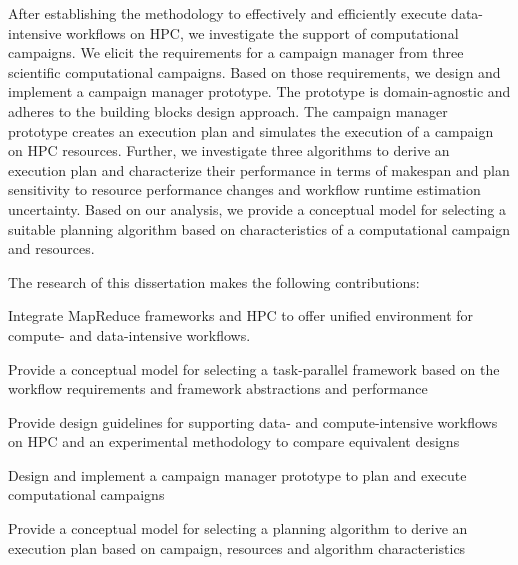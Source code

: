 After establishing the methodology to effectively and efficiently execute
data-intensive workflows on HPC, we investigate the support of computational
campaigns. We elicit the requirements for a campaign manager from three
scientific computational campaigns. Based on those requirements, we design and
implement a campaign manager prototype. The prototype is domain-agnostic and
adheres to the building blocks design approach. The campaign manager prototype
creates an execution plan and simulates the execution of a campaign on HPC
resources. Further, we investigate three algorithms to derive an execution plan
and characterize their performance in terms of makespan and plan sensitivity to
resource performance changes and workflow runtime estimation uncertainty. Based
on our analysis, we provide a conceptual model for selecting a suitable
planning algorithm based on characteristics of a computational campaign and
resources.

The research of this dissertation makes the following contributions:
\begin{inparaenum}
    \item Integrate MapReduce frameworks and HPC to offer unified environment
    for compute- and data-intensive workflows.
    \item Provide a conceptual model for selecting a task-parallel framework
    based on the workflow requirements and framework abstractions and
    performance
    \item Provide design guidelines for supporting data- and compute-intensive
    workflows on HPC and an experimental methodology to compare equivalent
    designs
    \item Design and implement a campaign manager prototype to plan and execute
    computational campaigns
    \item Provide a conceptual model for selecting a planning algorithm to 
    derive an execution plan based on campaign, resources and algorithm
    characteristics

\end{inparaenum}
